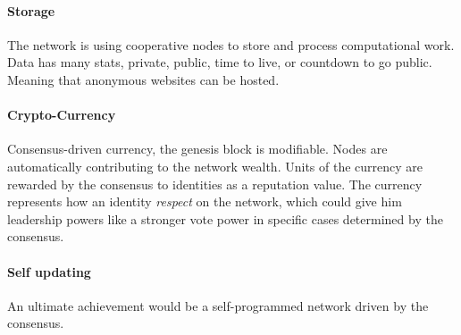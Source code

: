 \paragraph{Storage}
The network is using cooperative nodes to store and process computational work. Data has many stats, private, public, time to live, or countdown to go public. Meaning that anonymous websites can be hosted.

\paragraph{Crypto-Currency}
Consensus-driven currency, the genesis block is modifiable. Nodes are automatically contributing to the network wealth. Units of the currency are rewarded by the consensus to identities as a reputation value. The currency represents how an identity \textit{respect} on the network, which could give him leadership powers like a stronger vote power in specific cases determined by the consensus.

\paragraph{Self updating}
An ultimate achievement would be a self-programmed network driven by the consensus.\cite{Gabel2008DynamicallyDevelopers}

